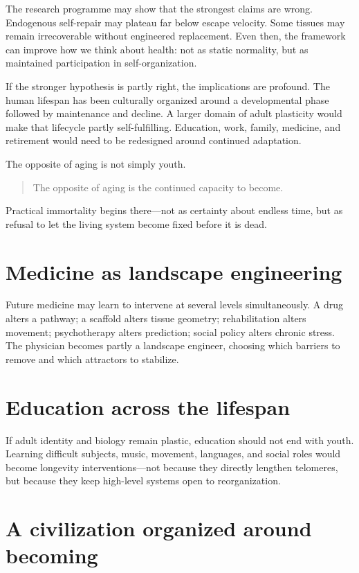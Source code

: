The research programme may show that the strongest claims are wrong. Endogenous self-repair may plateau far below escape velocity. Some tissues may remain irrecoverable without engineered replacement. Even then, the framework can improve how we think about health: not as static normality, but as maintained participation in self-organization.

If the stronger hypothesis is partly right, the implications are profound. The human lifespan has been culturally organized around a developmental phase followed by maintenance and decline. A larger domain of adult plasticity would make that lifecycle partly self-fulfilling. Education, work, family, medicine, and retirement would need to be redesigned around continued adaptation.

The opposite of aging is not simply youth.

\begin{quote}
The opposite of aging is the continued capacity to become.
\end{quote}

Practical immortality begins there---not as certainty about endless time, but as refusal to let the living system become fixed before it is dead.

\section{Medicine as landscape engineering}\label{medicine-as-landscape-engineering}

Future medicine may learn to intervene at several levels simultaneously. A drug alters a pathway; a scaffold alters tissue geometry; rehabilitation alters movement; psychotherapy alters prediction; social policy alters chronic stress. The physician becomes partly a landscape engineer, choosing which barriers to remove and which attractors to stabilize.

\section{Education across the lifespan}\label{education-across-the-lifespan}

If adult identity and biology remain plastic, education should not end with youth. Learning difficult subjects, music, movement, languages, and social roles would become longevity interventions---not because they directly lengthen telomeres, but because they keep high-level systems open to reorganization.

\section{A civilization organized around becoming}\label{a-civilization-organized-around-becoming}

